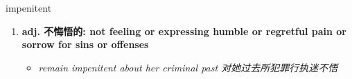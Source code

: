 
\begin{frame}
{\huge impenitent}
\begin{center}
\begin{enumerate}\Large
  \item \textbf{adj. 不悔悟的: not feeling or expressing humble or regretful pain or sorrow for sins or offenses}
  \begin{itemize}
    \item \em{\Large{remain impenitent about her criminal past 对她过去所犯罪行执迷不悟}}
  \end{itemize}
\end{enumerate}
\end{center}
\end{frame}
